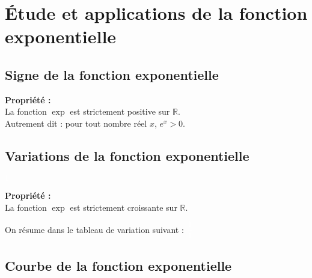 \documentclass[11pt,a4paper]{article}
\begin{document}
\section{Étude et applications de la fonction exponentielle}

\subsection{Signe de la fonction exponentielle}

\begin{mdframed}[style=proprieteStyle]
    \textbf{Propriété :} ~\\
    La fonction $\exp$ est strictement positive sur $\mathbb{R}$. \\
    Autrement dit : pour tout nombre réel $x$, $e^x>0$.
\end{mdframed}

\subsection{Variations de la fonction exponentielle}

\begin{minipage}[t]{0.35\textwidth} %
    $\displaystyle{\color{white}1}$
    \begin{mdframed}[style=proprieteStyle]
        \textbf{Propriété :} ~\\
        La fonction $\exp$ est strictement croissante sur $\mathbb{R}$.
    \end{mdframed}
\end{minipage}
\hspace{0.06\textwidth} %
\begin{minipage}[t]{0.6\textwidth} %
    On résume dans le tableau de variation suivant : $\displaystyle{\color{white}\frac{1}{1}}$ ~\\
\end{minipage}



\subsection{Courbe de la fonction exponentielle}
\end{document}
